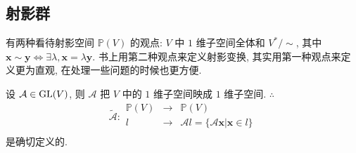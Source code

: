 \documentclass[color=black,device=normal,lang=cn,mode=geye]{elegantnote}
\begin{document}
\subsection{射影群}
有两种看待射影空间 $\mathbb{P}(V)$ 的观点: $V$ 中 $1$ 维子空间全体和 $V^*/\sim$, 其中 $\boldsymbol{x}\sim\boldsymbol{y}\Leftrightarrow\exists\lambda,\boldsymbol{x}=\lambda\boldsymbol{y}$. 书上用第二种观点来定义射影变换, 其实用第一种观点来定义更为直观, 在处理一些问题的时候也更方便.

设 $\mathcal{A}\in\operatorname{GL} (V)$, 则 $\mathcal{A}$ 把 $V$ 中的 $1$ 维子空间映成 $1$ 维子空间. $\therefore$
\[\widetilde{\mathcal{A}}:\begin{array}{rcl}
    \mathbb{P}(V) & \to & \mathbb{P}(V) \\
    l & \to & \mathcal{A}l=\{\mathcal{A}\boldsymbol{x}|\boldsymbol{x}\in l\} \\
\end{array}\]
是确切定义的.
\end{document}

